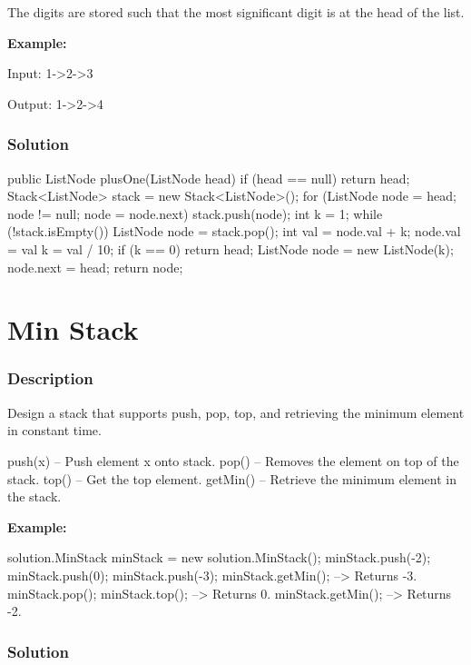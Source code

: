 The digits are stored such that the most significant digit is at the head of the list.

\textbf{Example:}
\begin{Code}
Input:
1->2->3

Output:
1->2->4
\end{Code}

\subsubsection{Solution}

\begin{Code}
public ListNode plusOne(ListNode head) {
    if (head == null) {
        return head;
    }
    Stack<ListNode> stack = new Stack<ListNode>();
    for (ListNode node = head; node != null; node = node.next) {
        stack.push(node);
    }
    int k = 1;
    while (!stack.isEmpty()) {
        ListNode node = stack.pop();
        int val = node.val + k;
        node.val = val %
        k = val / 10;
        if (k == 0) {
            return head;
        }
    }
    ListNode node = new ListNode(k);
    node.next = head;
    return node;
}
\end{Code}

\newpage

\section{Min Stack} %

\subsubsection{Description}
Design a stack that supports push, pop, top, and retrieving the minimum element in constant time.
\begin{Code}
push(x) -- Push element x onto stack.
pop() -- Removes the element on top of the stack.
top() -- Get the top element.
getMin() -- Retrieve the minimum element in the stack.
\end{Code}

\textbf{Example:}
\begin{Code}
solution.MinStack minStack = new solution.MinStack();
minStack.push(-2);
minStack.push(0);
minStack.push(-3);
minStack.getMin();   --> Returns -3.
minStack.pop();
minStack.top();      --> Returns 0.
minStack.getMin();   --> Returns -2.
\end{Code}
\subsubsection{Solution}

